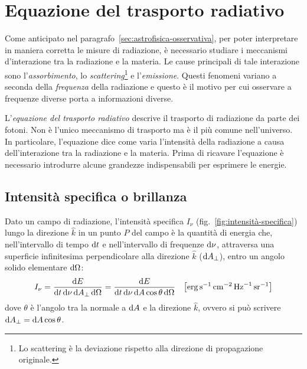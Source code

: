 \section{Equazione del trasporto radiativo}\label{sec:intro-trasporto-radiativo}
Come anticipato nel paragrafo~\ref{sec:astrofisica-osservativa}, per poter interpretare in maniera corretta le misure di radiazione, è necessario studiare i meccanismi d'interazione tra la radiazione e la materia. Le cause principali di tale interazione sono l'\emph{assorbimento}, lo \emph{scattering}\footnote{Lo scattering è la deviazione rispetto alla direzione di propagazione originale.} e l'\emph{emissione}. Questi fenomeni variano a seconda della \emph{frequenza} della radiazione e questo è il motivo per cui osservare a frequenze diverse porta a informazioni diverse.

L'\emph{equazione del trasporto radiativo} descrive il trasporto di radiazione da parte dei fotoni. Non è l'unico meccanismo di trasporto ma è il più comune nell'universo. In particolare, l'equazione dice come varia l'intensità della radiazione a causa dell'interazione tra la radiazione e la materia. Prima di ricavare l'equazione è necessario introdurre alcune grandezze indispensabili per esprimere le energie.

\subsection{Intensità specifica o brillanza}\label{sec:intensità}
Dato un campo di radiazione, l'intensità specifica $I_\nu$ (fig.~\ref{fig:intensità-specifica}) lungo la direzione $\hat{k}$ in un punto $P$ del campo è la quantità di energia che, nell'intervallo di tempo $\ud t$ e nell'intervallo di frequenze $\ud \nu$, attraversa una superficie infinitesima perpendicolare alla direzione $\hat{k}$ ($\ud A_\perp$), entro un angolo solido elementare $\ud \Omega$:
\begin{equation}\label{eq:intensità}
    I_\nu = \frac{\ud E}{\ud t \ud \nu \ud A_\perp \ud \Omega} = \frac{\ud E}{\ud t \ud \nu \ud A \cos{\theta} \ud \Omega} \quad \bigl[\si{erg.s^{-1}.cm^{-2}.Hz^{-1}.sr^{-1}}\bigr]
\end{equation}
dove $\theta$ è l'angolo tra la normale a $\ud A$ e la direzione $\hat{k}$, ovvero si può scrivere $\ud A_\perp = \ud A \cos{\theta}$.


